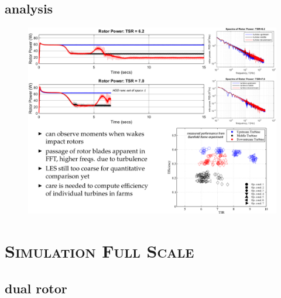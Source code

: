 \documentclass[xcolor=x11names,compress]{beamer}
\begin{document}
\subsection{analysis}
	
	\begin{frame}{}
		
		\vspace{-20pt}

		\begin{figure}[p]
		    \centering
		    \includegraphics[width=1.08\textwidth]{figures/Analysis_Slide.png}
		\end{figure}

	\end{frame}

\section{\scshape Simulation Full Scale}

\subsection{dual rotor}
\end{document}
